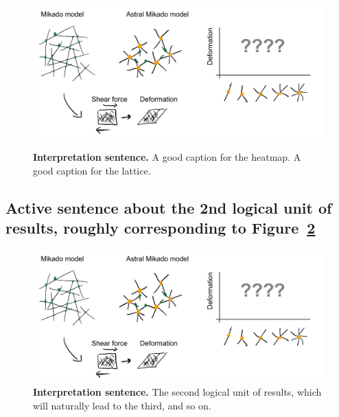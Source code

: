 \documentclass[onecolumn,11pt]{article}
\begin{document}
\begin{figure}[!htbp]
        \centering
        \begin{subcaptiongroup}
                \includegraphics[width=165mm]{figures/figJeanJacket.pdf}
                \label{subfig:heatmap}
                \label{subfig:lattice}
                \end{subcaptiongroup}
        \captionsetup{subrefformat=parens}
        \caption{\label{fig:majorfig}\textbf{Interpretation sentence.}
                 A good caption for the heatmap. 
                 A good caption for the lattice. 
                }
\end{figure}

\lipsum[2]  


\clearpage %
\subsection*{Active sentence about the 2nd logical unit of results, roughly corresponding to Figure~\ref{fig:2ndresult}}

\lipsum[2-4]  
\begin{figure}[!htbp]
        \centering
        \includegraphics[width=165mm]{figures/figJeanJacket.pdf}
        \caption{\label{fig:2ndresult}\textbf{Interpretation sentence.}
               The second logical unit of results, which will naturally lead to the third, and so on.
                }
\end{figure}
\lipsum[5-6]  
\end{document}

